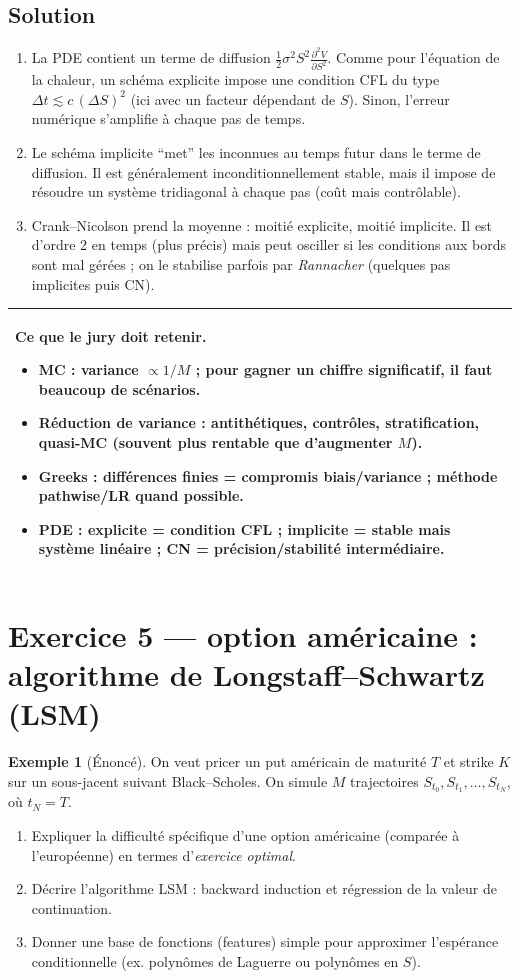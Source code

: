 \documentclass[11pt,a4paper]{report}
\newcommand{\1}{\mathbbm{1}}
\newcommand{\pdd}[2]{\frac{\partial^2 #1}{\partial #2^2}}
\theoremstyle{definition}
\newtheorem{example}{Exemple}[chapter]
\theoremstyle{plain}
\theoremstyle{remark}
\newenvironment{jurybox}{%
  \begin{center}
  \setlength{\tabcolsep}{6pt}%
  \renewcommand{\arraystretch}{1.1}%
  \begin{tabular}{|p{0.94\textwidth}|}
  \hline
  \small\textbf{Ce que le jury doit retenir.}\par\medskip
}{%
  \\ \hline
  \end{tabular}
  \end{center}
}
\begin{document}
\subsection*{Solution}
\begin{enumerate}[label=\alph*)]
  \item La PDE contient un terme de diffusion $\tfrac12\sigma^2 S^2\pdd{V}{S}$.
  Comme pour l'équation de la chaleur, un schéma explicite impose une condition CFL du type
  \(\Delta t\lesssim c\,(\Delta S)^2\) (ici avec un facteur dépendant de $S$).
  Sinon, l'erreur numérique s'amplifie à chaque pas de temps.
  \item Le schéma implicite ``met'' les inconnues au temps futur dans le terme de diffusion.
  Il est généralement inconditionnellement stable, mais il impose de résoudre un système tridiagonal à chaque pas (coût mais contrôlable).
  \item Crank--Nicolson prend la moyenne : moitié explicite, moitié implicite.
  Il est d'ordre 2 en temps (plus précis) mais peut osciller si les conditions aux bords sont mal gérées ; on le stabilise parfois par \emph{Rannacher} (quelques pas implicites puis CN).
\end{enumerate}

\begin{jurybox}
\begin{itemize}
  \item MC : variance $\propto 1/M$ ; pour gagner un chiffre significatif, il faut beaucoup de scénarios.
  \item Réduction de variance : antithétiques, contrôles, stratification, quasi-MC (souvent plus rentable que d'augmenter $M$).
  \item Greeks : différences finies = compromis biais/variance ; méthode pathwise/LR quand possible.
  \item PDE : explicite = condition CFL ; implicite = stable mais système linéaire ; CN = précision/stabilité intermédiaire.
\end{itemize}
\end{jurybox}

\section{Exercice 5 --- option américaine : algorithme de Longstaff--Schwartz (LSM)}
\begin{example}[Énoncé]
On veut pricer un put américain de maturité $T$ et strike $K$ sur un sous-jacent suivant Black--Scholes.
On simule $M$ trajectoires $S_{t_0},S_{t_1},\dots,S_{t_N}$, où $t_N=T$.
\begin{enumerate}[label=\alph*)]
  \item Expliquer la difficulté spécifique d'une option américaine (comparée à l'européenne) en termes d'\emph{exercice optimal}.
  \item Décrire l'algorithme LSM : backward induction et régression de la valeur de continuation.
  \item Donner une base de fonctions (features) simple pour approximer l'espérance conditionnelle (ex. polynômes de Laguerre ou polynômes en $S$).
\end{enumerate}
\end{example}
\end{document}

